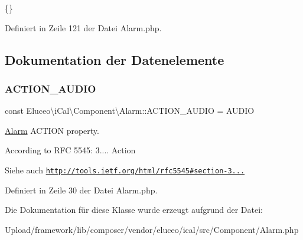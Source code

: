 \{\} 

Definiert in Zeile 121 der Datei Alarm.\+php.



\subsection{Dokumentation der Datenelemente}
\mbox{\label{class_eluceo_1_1i_cal_1_1_component_1_1_alarm_a17eff4fa9c447a7f9d870c94c715f731}} 
\subsubsection{\texorpdfstring{A\+C\+T\+I\+O\+N\+\_\+\+A\+U\+D\+IO}{ACTION\_AUDIO}}
{\footnotesize\ttfamily const Eluceo\textbackslash{}i\+Cal\textbackslash{}\+Component\textbackslash{}\+Alarm\+::\+A\+C\+T\+I\+O\+N\+\_\+\+A\+U\+D\+IO = \textquotesingle{}A\+U\+D\+IO\textquotesingle{}}

\mbox{\hyperlink{class_eluceo_1_1i_cal_1_1_component_1_1_alarm}{Alarm}} A\+C\+T\+I\+ON property.

According to R\+FC 5545\+: 3.... Action

\begin{DoxySeeAlso}{Siehe auch}
\href{http://tools.ietf.org/html/rfc5545#section-3.8.6.1}{\tt http\+://tools.\+ietf.\+org/html/rfc5545\#section-\/3...} 
\end{DoxySeeAlso}


Definiert in Zeile 30 der Datei Alarm.\+php.



Die Dokumentation für diese Klasse wurde erzeugt aufgrund der Datei\+:\begin{DoxyCompactItemize}
\item 
Upload/framework/lib/composer/vendor/eluceo/ical/src/\+Component/Alarm.\+php\end{DoxyCompactItemize}
